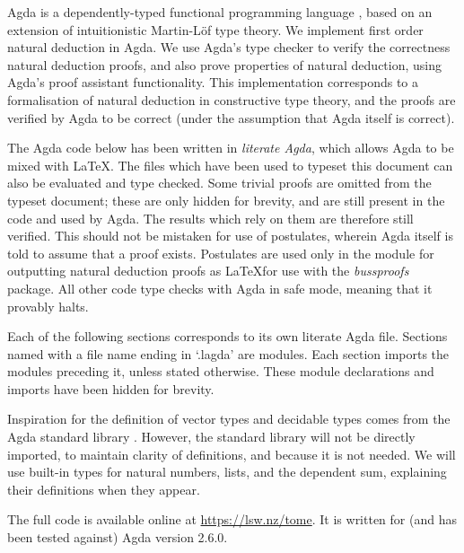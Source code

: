 Agda \citep{agdawiki} is a dependently-typed functional programming language
\citep{norellthesis}, based on an extension of intuitionistic Martin-L{\"o}f
type theory. We implement first order natural deduction in Agda. We use Agda's
type checker to verify the correctness natural deduction proofs, and also prove
properties of natural deduction, using Agda's proof assistant functionality.
This implementation corresponds to a formalisation of natural deduction in
constructive type theory, and the proofs are verified by Agda to be correct
(under the assumption that Agda itself is correct).

The Agda code below has been written in \emph{literate Agda}, which allows Agda
to be mixed with \LaTeX. The files which have been used to typeset this document
can also be evaluated and type checked. Some trivial proofs are omitted from the
typeset document; these are only hidden for brevity, and are still present in
the code and used by Agda. The results which rely on them are therefore still
verified. This should not be mistaken for use of postulates, wherein Agda itself
is told to assume that a proof exists. Postulates are used only in the module
for outputting natural deduction proofs as \LaTeX for use with the
\emph{bussproofs} package. All other code type checks with Agda in safe mode,
meaning that it provably halts.

Each of the following sections corresponds to its own literate Agda file.
Sections named with a file name ending in `.lagda' are modules. Each section
imports the modules preceding it, unless stated otherwise. These module
declarations and imports have been hidden for brevity.

Inspiration for the definition of vector types and decidable types comes from
the Agda standard library \citep{agdastdlib}. However, the standard library will
not be directly imported, to maintain clarity of definitions, and because it is
not needed. We will use built-in types for natural numbers, lists, and the
dependent sum, explaining their definitions when they appear.

The full code is available online at {\small \url{https://lsw.nz/tome}}. It is
written for (and has been tested against) Agda version 2.6.0.
